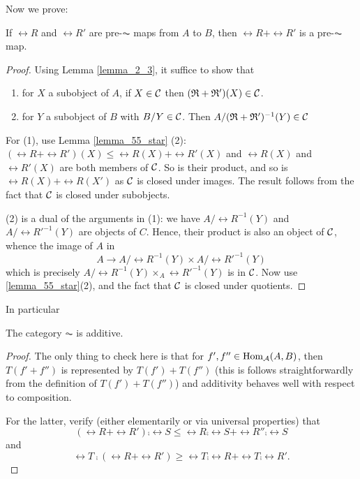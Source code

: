 Now we prove:

\begin{prop}
If $\rel{R}$ and $\rel{R}'$ are pre-$\AC$ maps from $A$ to $B$,
then $\rel{R} + \rel{R}'$ is a pre-$\AC$ map.
\end{prop}
\begin{proof}
Using Lemma \ref{lemma_2_3}, it suffice to show that
\begin{enumerate}
\item for $X$ a subobject of $A$, if $X \in \mathcal{C}$ then 
$(\mathfrak R + \mathfrak R')(X) \in \mathcal{C}$.

\item for $Y$ a subobject of $B$ with $B/Y \in \mathcal{C}$. Then
$A/(\mathfrak R + \mathfrak R')^{-1}(Y) \in \mathcal{C}$
\end{enumerate}

For (1), use Lemma \ref{lemma_55_star} (2): $(\rel{R} + 
\rel{R}')(X) \leq \rel{R}(X) + \rel{R}'(X)$ and $\rel{R}(X)$ and 
$\rel{R}'(X)$ are both members of $\mathcal{C}$. So is their product,
and so is $\rel{R}(X) + \rel{R}(X')$ as $\mathcal{C}$ is closed under
images. The result follows from the fact that $\mathcal{C}$ is closed
under subobjects.

(2) is a dual of the arguments in (1): we have $A/\rel{R}^{-1}(Y)$ 
and $A/\rel{R}'^{-1}(Y)$ are objects of $C$. Hence, their product 
is also an object of $\mathcal{C}$, whence the image of $A$ in
\[
A \to A/\rel{R}^{-1}(Y) \times A/\rel{R}'^{-1}(Y) 
\]
which is precisely $A/\rel{R}^{-1}(Y) \times_A \rel{R}'^{-1}(Y)$ 
is in $\mathcal{C}$. Now use \ref{lemma_55_star}(2), and the fact that
$\mathcal{C}$ is closed under quotients.
\end{proof}

In particular

\begin{cor}
The category $\AC$ is additive.
\end{cor}
\begin{proof}
The only thing to check here is that for $f', f'' \in 
\mathrm{Hom}_{\mathcal{A}}(A,B)$, then $T(f' + f'')$ is represented by $T(f')
+ T(f'')$ (this is follows straightforwardly from the definition
of $T(f') + T(f'')$) and additivity behaves well with respect to
composition.

For the latter, verify (either elementarily or via universal 
properties) that
\[
(\rel{R} + \rel{R}')\comp \rel{S} \leq
   \rel{R} \comp \rel{S} + \rel{R}'' \comp \rel{S}
\]
and
\[
\rel{T} \comp (\rel{R} + \rel{R}') \geq 
   \rel{T} \comp \rel{R} + \rel{T} \comp \rel{R'}.
\]
\end{proof}

